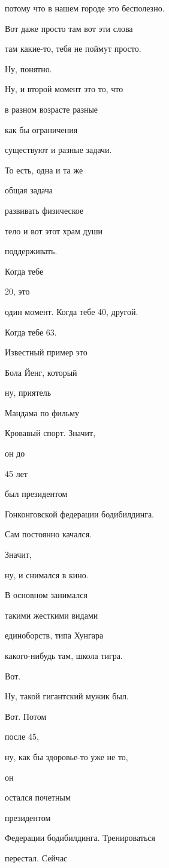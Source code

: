 потому что в нашем городе это бесполезно.

Вот даже просто там вот эти слова

там какие-то, тебя не поймут просто.

Ну, понятно.

Ну, и второй момент это то, что

в разном возрасте разные

как бы ограничения

существуют и разные задачи.

То есть, одна и та же

общая задача

развивать физическое

тело и вот этот храм души

поддерживать.

Когда тебе

20, это

один момент. Когда тебе 40, другой.

Когда тебе 63.

Известный пример это

Бола Йенг, который

ну, приятель

Мандама по фильму

Кровавый спорт. Значит,

он до

45 лет

был президентом

Гонконговской федерации бодибилдинга.

Сам постоянно качался.

Значит,

ну, и снимался в кино.

В основном занимался

такими жесткими видами

единоборств, типа Хунгара

какого-нибудь там, школа тигра.

Вот.

Ну, такой гигантский мужик был.

Вот. Потом

после 45,

ну, как бы здоровье-то уже не то,

он

остался почетным

президентом

Федерации бодибилдинга. Тренироваться

перестал. Сейчас

